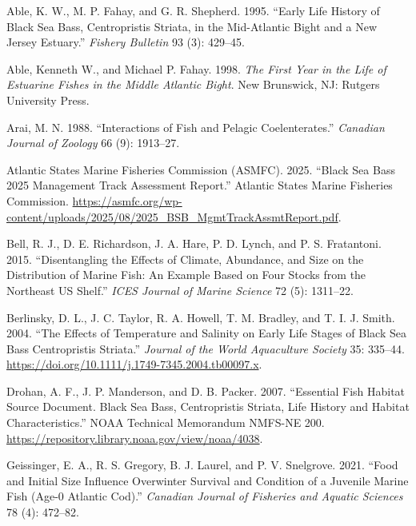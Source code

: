 \documentclass[
  letterpaper,
  DIV=11,
  numbers=noendperiod]{scrartcl}
\newlength{\cslhangindent}
\newenvironment{CSLReferences}[2] %
 {\begin{list}{}{%
  \setlength{\itemindent}{0pt}
  \setlength{\leftmargin}{0pt}
  \setlength{\parsep}{0pt}
  \ifodd #1
   \setlength{\leftmargin}{\cslhangindent}
   \setlength{\itemindent}{-1\cslhangindent}
  \fi
  \setlength{\itemsep}{#2\baselineskip}}}
 {\end{list}}
\begin{document}
\label{refs}
\begin{CSLReferences}{1}{0}
Able, K. W., M. P. Fahay, and G. R. Shepherd. 1995. {``Early Life
History of Black Sea Bass, {C}entropristis Striata, in the
Mid-{A}tlantic {B}ight and a {N}ew {J}ersey Estuary.''} \emph{Fishery
Bulletin} 93 (3): 429--45.

Able, Kenneth W., and Michael P. Fahay. 1998. \emph{The First Year in
the Life of Estuarine Fishes in the Middle Atlantic Bight}. New
Brunswick, NJ: Rutgers University Press.

Arai, M. N. 1988. {``Interactions of Fish and Pelagic Coelenterates.''}
\emph{Canadian Journal of Zoology} 66 (9): 1913--27.

Atlantic States Marine Fisheries Commission (ASMFC). 2025. {``Black Sea
Bass 2025 Management Track Assessment Report.''} Atlantic States Marine
Fisheries Commission.
\url{https://asmfc.org/wp-content/uploads/2025/08/2025_BSB_MgmtTrackAssmtReport.pdf}.

Bell, R. J., D. E. Richardson, J. A. Hare, P. D. Lynch, and P. S.
Fratantoni. 2015. {``Disentangling the Effects of Climate, Abundance,
and Size on the Distribution of Marine Fish: An Example Based on Four
Stocks from the Northeast US Shelf.''} \emph{ICES Journal of Marine
Science} 72 (5): 1311--22.

Berlinsky, D. L., J. C. Taylor, R. A. Howell, T. M. Bradley, and T. I.
J. Smith. 2004. {``The Effects of Temperature and Salinity on Early Life
Stages of Black Sea Bass {C}entropristis Striata.''} \emph{Journal of
the World Aquaculture Society} 35: 335--44.
\url{https://doi.org/10.1111/j.1749-7345.2004.tb00097.x}.

Drohan, A. F., J. P. Manderson, and D. B. Packer. 2007. {``Essential
Fish Habitat Source Document. {B}lack Sea Bass, {C}entropristis Striata,
Life History and Habitat Characteristics.''} NOAA Technical Memorandum
NMFS-NE 200. \url{https://repository.library.noaa.gov/view/noaa/4038}.

Geissinger, E. A., R. S. Gregory, B. J. Laurel, and P. V. Snelgrove.
2021. {``Food and Initial Size Influence Overwinter Survival and
Condition of a Juvenile Marine Fish (Age-0 {A}tlantic Cod).''}
\emph{Canadian Journal of Fisheries and Aquatic Sciences} 78 (4):
472--82.


\end{CSLReferences}
\end{document}
